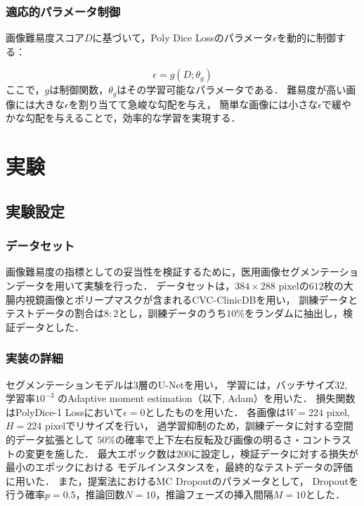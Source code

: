 \documentclass[10pt, a4paper, twocolumn]{jarticle}
\begin{document}
\subsubsection{適応的パラメータ制御}
画像難易度スコア$D$に基づいて，Poly Dice Lossのパラメータ$\epsilon$を動的に制御する：

\begin{equation}
  \epsilon = g(D; \theta_g)
\end{equation}
ここで，$g$は制御関数，$\theta_g$はその学習可能なパラメータである．
難易度が高い画像には大きな$\epsilon$を割り当てて急峻な勾配を与え，
簡単な画像には小さな$\epsilon$で緩やかな勾配を与えることで，効率的な学習を実現する．


\newpage

\section{実験}
\subsection{実験設定}
\subsubsection{データセット}
画像難易度の指標としての妥当性を検証するために，医用画像セグメンテーションデータを用いて実験を行った．
データセットは，$384 \times 288$ pixelの$612$枚の大腸内視鏡画像とポリープマスクが含まれるCVC-ClinicDB\cite{BERNAL201599}を用い，
訓練データとテストデータの割合は$8:2$とし，訓練データのうち$10 \%$をランダムに抽出し，検証データとした．

\subsubsection{実装の詳細}
セグメンテーションモデルは$3$層のU-Net\cite{ronneberger2015u}を用い，
学習には，バッチサイズ$32$, 学習率$10 ^ {-3}$ のAdaptive moment
estimation（以下, Adam）\cite{kingma2014adam}を用いた．
損失関数はPolyDice-1 Lossにおいて$\epsilon = 0$としたものを用いた．
各画像は$W = 224$ pixel, $H = 224$ pixelでリサイズを行い，
過学習抑制のため，訓練データに対する空間的データ拡張として
$50\%$の確率で上下左右反転及び画像の明るさ・コントラストの変更を施した．
最大エポック数は$200$に設定し，検証データに対する損失が最小のエポックにおける
モデルインスタンスを，最終的なテストデータの評価に用いた．
また，提案法におけるMC Dropoutのパラメータとして，
Dropoutを行う確率$p = 0.5$，推論回数$N = 10$，推論フェーズの挿入間隔$M = 10$とした．
\end{document}
